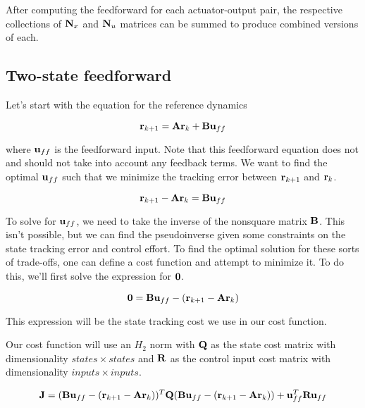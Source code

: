 After computing the feedforward for each actuator-output pair, the respective
collections of $\mathbf{N}_x$ and $\mathbf{N}_u$ matrices can be summed to produce
combined versions of each.

\subsection{Two-state feedforward}

Let's start with the equation for the reference dynamics

\begin{equation*}
  \mathbf{r}_{k+1} = \mathbf{A}\mathbf{r}_k + \mathbf{B}\mathbf{u}_{ff}
\end{equation*}

where $\mathbf{u}_{ff}$ is the feedforward input. Note that this feedforward
equation does not and should not take into account any feedback terms. We want
to find the optimal $\mathbf{u}_{ff}$ such that we minimize the tracking error
between $\mathbf{r}_{k+1}$ and $\mathbf{r}_k$.

\begin{equation*}
  \mathbf{r}_{k+1} - \mathbf{A}\mathbf{r}_k = \mathbf{B}\mathbf{u}_{ff}
\end{equation*}

To solve for $\mathbf{u}_{ff}$, we need to take the inverse of the nonsquare matrix
$\mathbf{B}$. This isn't possible, but we can find the pseudoinverse given some
constraints on the state tracking error and control effort. To find the optimal
solution for these sorts of trade-offs, one can define a cost function and
attempt to minimize it. To do this, we'll first solve the expression for
$\mathbf{0}$.

\begin{equation*}
  \mathbf{0} = \mathbf{B}\mathbf{u}_{ff} - (\mathbf{r}_{k+1} - \mathbf{A}\mathbf{r}_k)
\end{equation*}

This expression will be the state tracking cost we use in our cost function.

Our cost function will use an $H_2$ norm with $\mathbf{Q}$ as the state cost matrix
with dimensionality $states \times states$ and $\mathbf{R}$ as the control input
cost matrix with dimensionality $inputs \times inputs$.

\begin{equation*}
  \mathbf{J} = (\mathbf{B}\mathbf{u}_{ff} - (\mathbf{r}_{k+1} - \mathbf{A}\mathbf{r}_k))^T \mathbf{Q}
    (\mathbf{B}\mathbf{u}_{ff} - (\mathbf{r}_{k+1} - \mathbf{A}\mathbf{r}_k)) +
    \mathbf{u}_{ff}^T\mathbf{R}\mathbf{u}_{ff}
\end{equation*}

